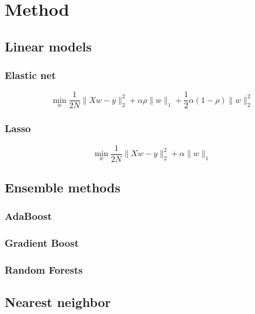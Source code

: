 \section{Method}
\label{sec:method}

\subsection{Linear models}
\label{sub:linear_models}

\subsubsection{Elastic net}
\label{ssub:elastic_net}
\begin{equation}
  \min_w\frac{1}{2N}\|Xw - y\|^2_2 + \alpha\rho\|w\|_1 + \frac{1}{2}\alpha(1-\rho)\|w\|^2_2
\end{equation}

\subsubsection{Lasso}
\label{ssub:lasso}

\begin{equation}
  \min_w\frac{1}{2N}\|Xw - y\|^2_2 + \alpha\|w\|_1
\end{equation}

\subsection{Ensemble methods}
\label{sub:ensemble_methods}
\subsubsection{AdaBoost}
\label{ssub:adaboost}
\subsubsection{Gradient Boost}
\label{ssub:gradient_boost}
\subsubsection{Random Forests}
\label{ssub:random_forests}

\subsection{Nearest neighbor}
\label{sub:nearest_neighbor}


